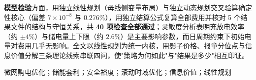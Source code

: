 \textbf{模型检验}方面，用独立线性规划（母线侧变量布局）与独立动态规划交叉验算确定性核心（偏差 $7\times10^{-8}$ 与 $0.276\%$），用独立结算公式复算全部费用并核对 5 个结果文件的结构与守恒关系，共 \textbf{40 项检查全部通过}；灵敏度分析表明充放电效率（约 $\pm4\%$）与储电量上下限（约 $2.6\%$）是主要影响参数，而日周期约束下初始电量对费用几乎无影响。全文以线性规划为统一内核，用影子价格、报童分位点与信息价值分解三条理论线索串联四问，使"策略为何如此"与"结果是多少"相互印证。

\vspace{6pt}
\quad 微网购电优化；储能套利；安全裕度；滚动时域优化；信息价值；线性规划
\endgroup
